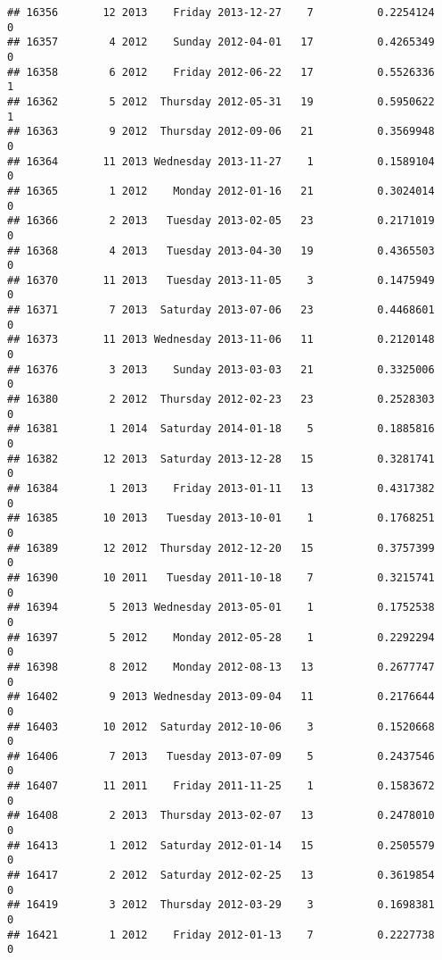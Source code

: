 \documentclass[
]{article}
\begin{document}
\begin{verbatim}
## 16356       12 2013    Friday 2013-12-27    7          0.2254124             0
## 16357        4 2012    Sunday 2012-04-01   17          0.4265349             0
## 16358        6 2012    Friday 2012-06-22   17          0.5526336             1
## 16362        5 2012  Thursday 2012-05-31   19          0.5950622             1
## 16363        9 2012  Thursday 2012-09-06   21          0.3569948             0
## 16364       11 2013 Wednesday 2013-11-27    1          0.1589104             0
## 16365        1 2012    Monday 2012-01-16   21          0.3024014             0
## 16366        2 2013   Tuesday 2013-02-05   23          0.2171019             0
## 16368        4 2013   Tuesday 2013-04-30   19          0.4365503             0
## 16370       11 2013   Tuesday 2013-11-05    3          0.1475949             0
## 16371        7 2013  Saturday 2013-07-06   23          0.4468601             0
## 16373       11 2013 Wednesday 2013-11-06   11          0.2120148             0
## 16376        3 2013    Sunday 2013-03-03   21          0.3325006             0
## 16380        2 2012  Thursday 2012-02-23   23          0.2528303             0
## 16381        1 2014  Saturday 2014-01-18    5          0.1885816             0
## 16382       12 2013  Saturday 2013-12-28   15          0.3281741             0
## 16384        1 2013    Friday 2013-01-11   13          0.4317382             0
## 16385       10 2013   Tuesday 2013-10-01    1          0.1768251             0
## 16389       12 2012  Thursday 2012-12-20   15          0.3757399             0
## 16390       10 2011   Tuesday 2011-10-18    7          0.3215741             0
## 16394        5 2013 Wednesday 2013-05-01    1          0.1752538             0
## 16397        5 2012    Monday 2012-05-28    1          0.2292294             0
## 16398        8 2012    Monday 2012-08-13   13          0.2677747             0
## 16402        9 2013 Wednesday 2013-09-04   11          0.2176644             0
## 16403       10 2012  Saturday 2012-10-06    3          0.1520668             0
## 16406        7 2013   Tuesday 2013-07-09    5          0.2437546             0
## 16407       11 2011    Friday 2011-11-25    1          0.1583672             0
## 16408        2 2013  Thursday 2013-02-07   13          0.2478010             0
## 16413        1 2012  Saturday 2012-01-14   15          0.2505579             0
## 16417        2 2012  Saturday 2012-02-25   13          0.3619854             0
## 16419        3 2012  Thursday 2012-03-29    3          0.1698381             0
## 16421        1 2012    Friday 2012-01-13    7          0.2227738             0

\end{verbatim}
\end{document}
